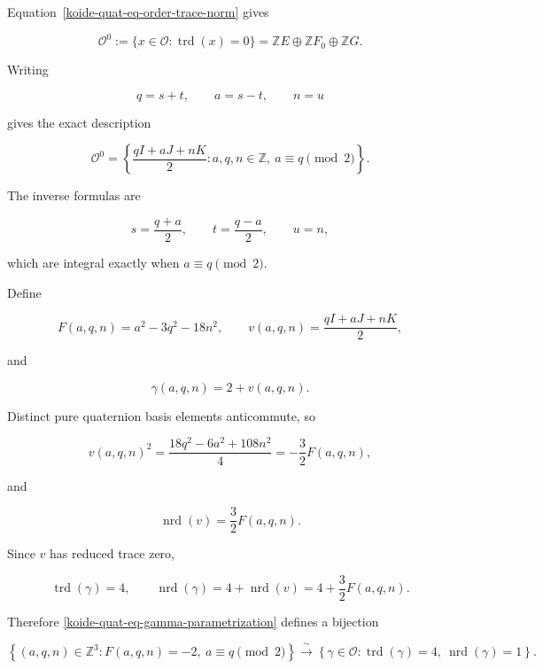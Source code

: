 Equation~\eqref{koide-quat-eq-order-trace-norm} gives

\[
 \mathcal O^0
 :=\{x\in\mathcal O:\operatorname{trd}(x)=0\}
 =\mathbb ZE\oplus\mathbb ZF_0\oplus\mathbb ZG.
\]

Writing

\[
 q=s+t,\qquad a=s-t,\qquad n=u
\]

gives the exact description

\begin{equation}\label{koide-quat-eq-trace-zero-lattice}
 \boxed{
 \mathcal O^0=
 \left\{
 \frac{qI+aJ+nK}{2}:
 a,q,n\in\mathbb Z,\ a\equiv q\pmod2
 \right\}.}
\end{equation}

The inverse formulas are

\[
 s=\frac{q+a}{2},\qquad
 t=\frac{q-a}{2},\qquad
 u=n,
\]

which are integral exactly when \(a\equiv q\pmod2\).

Define

\[
 F(a,q,n)=a^2-3q^2-18n^2,
 \qquad
 v(a,q,n)=\frac{qI+aJ+nK}{2},
\]

and

\begin{equation}\label{koide-quat-eq-gamma-parametrization}
 \gamma(a,q,n)=2+v(a,q,n).
\end{equation}

Distinct pure quaternion basis elements anticommute, so

\begin{equation}\label{koide-quat-eq-pure-square}
 v(a,q,n)^2
 =\frac{18q^2-6a^2+108n^2}{4}
 =-\frac32F(a,q,n),
\end{equation}

and

\[
 \operatorname{nrd}(v)=\frac32F(a,q,n).
\]

Since \(v\) has reduced trace zero,

\begin{equation}\label{koide-quat-eq-gamma-trace-norm}
 \operatorname{trd}(\gamma)=4,
 \qquad
 \operatorname{nrd}(\gamma)
 =4+\operatorname{nrd}(v)
 =4+\frac32F(a,q,n).
\end{equation}

Therefore \eqref{koide-quat-eq-gamma-parametrization} defines a bijection

\begin{equation}\label{koide-quat-eq-shell-bijection}
 \boxed{
 \left\{(a,q,n)\in\mathbb Z^3:
 F(a,q,n)=-2,\ a\equiv q\pmod2\right\}
 \xrightarrow{\ \sim\ }
 \left\{\gamma\in\mathcal O:
 \operatorname{trd}(\gamma)=4,\
 \operatorname{nrd}(\gamma)=1\right\}.}
\end{equation}

